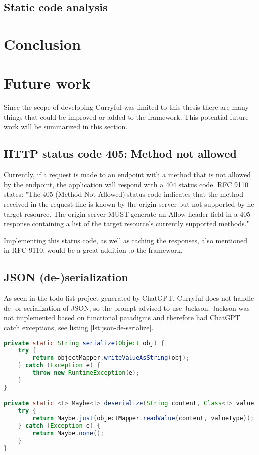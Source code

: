 \documentclass[a4paper,titlepage]{article}
\begin{document}
\subsection{Static code analysis}

\section{Conclusion}

\section{Future work}
Since the scope of developing Curryful was limited to this thesis there are many
things that could be improved or added to the framework. This potential future
work will be summarized in this section.

\subsection{HTTP status code 405: Method not allowed}
Currently, if a request is made to an endpoint with a method that is not allowed
by the endpoint, the application will respond with a 404 status code. RFC 9110
states: "The 405 (Method Not Allowed) status code indicates that the method
received in the request-line is known by the origin server but not supported by
he target resource. The origin server MUST generate an Allow header field in a
405 response containing a list of the target resource's currently supported
methods." \cite{fielding2022rfc}

Implementing this status code, as well as caching the responses, also mentioned
in RFC 9110, would be a great addition to the framework.

\subsection{JSON (de-)serialization}
As seen in the todo list project generated by ChatGPT, Curryful does not handle
de- or serialization of JSON, so the prompt advised to use Jackson. Jackson was
not implemented based on functional paradigms and therefore had ChatGPT catch
exceptions, see listing \ref{lst:json-de-serialize}.\newline

\begin{lstlisting}[language=Java, caption=ChatGPT generated code to
		(de-)serialize JSON, captionpos=b, label=lst:json-de-serialize]
private static String serialize(Object obj) {
	try {
		return objectMapper.writeValueAsString(obj);
	} catch (Exception e) {
		throw new RuntimeException(e);
	}
}

private static <T> Maybe<T> deserialize(String content, Class<T> valueType) {
	try {
		return Maybe.just(objectMapper.readValue(content, valueType));
	} catch (Exception e) {
		return Maybe.none();
	}
}
\end{lstlisting}
\end{document}
